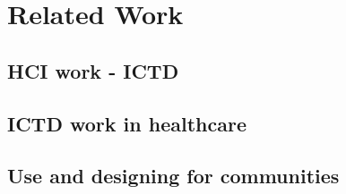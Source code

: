 \section{Related Work}
\begin{comment}
There are two, or three ways to do this. The first is to not do a RW section at all. In this case, you let the data/analysis connect with prior work as you go along. It would be nice if this could be sufficient but most often it is not. Further, people expect a section on prior work so you make it easier for reviewers to understand which body of work you are drawing on and extending.
 And yes, always draw on and extend. You want to contribute to a body of knowledge that already exists, because together as academics, that is our goal. However, you also want to extend that body of knowledge (otherwise why write this paper?). 
The second way to do this is to break RW down into subsections that are like circles in a venn diagram. Your research falls into the intersection of those circles. They may or may not intersect at multiple points. The important thing is to cover every paper that has a leaning/focus similar to yours. So you could do -- “Our paper builds on XYZ work. Here’s X and here’s how we extend it. Here’s Y and …”
The third (and slightly more preferable way, according to me) is to make the related work section flow instead of have it broken down into these discrete sections like I just mentioned. Tell it like a story, not like a list of papers. Make it seem thoughtful and nuanced, instead of a “1, 2, 3” listing. 
You can look at the Mobile Phones for Maternal Health in Rural India paper that I wrote for CHI 2015 as an example. It is by no means the best way to do this, but it did not raise any eyebrows in the review process, at least. One subsection (or 2-3 paragraphs) could be dedicated just to the theoretical lens, if you are using one.
\end{comment}
\textcolor{red}{}
\subsection{HCI work - ICTD}
\subsection{ICTD work in healthcare}
\subsection{Use and designing for communities}
